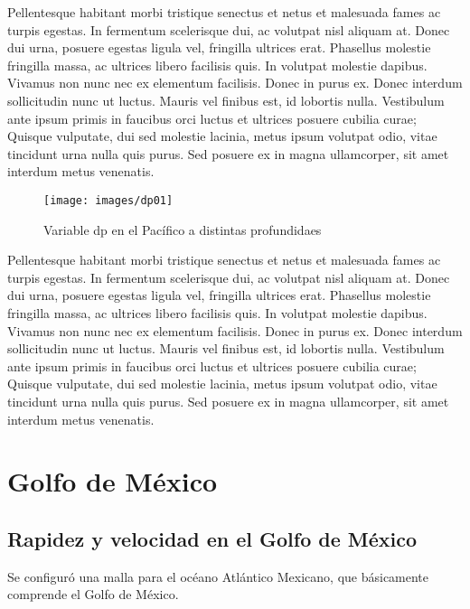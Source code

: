 \documentclass[
]{article}
\begin{document}
Pellentesque habitant morbi tristique senectus et netus et malesuada fames ac turpis egestas. In fermentum scelerisque dui, ac volutpat nisl aliquam at. Donec dui urna, posuere egestas ligula vel, fringilla ultrices erat. Phasellus molestie fringilla massa, ac ultrices libero facilisis quis. In volutpat molestie dapibus. Vivamus non nunc nec ex elementum facilisis. Donec in purus ex. Donec interdum sollicitudin nunc ut luctus. Mauris vel finibus est, id lobortis nulla. Vestibulum ante ipsum primis in faucibus orci luctus et ultrices posuere cubilia curae; Quisque vulputate, dui sed molestie lacinia, metus ipsum volutpat odio, vitae tincidunt urna nulla quis purus. Sed posuere ex in magna ullamcorper, sit amet interdum metus venenatis.

\begin{figure}
\texttt{[image: images/dp01]} \caption{Variable dp en el Pacífico a distintas profundidaes}\label{fig:Mapa02}
\end{figure}

Pellentesque habitant morbi tristique senectus et netus et malesuada fames ac turpis egestas. In fermentum scelerisque dui, ac volutpat nisl aliquam at. Donec dui urna, posuere egestas ligula vel, fringilla ultrices erat. Phasellus molestie fringilla massa, ac ultrices libero facilisis quis. In volutpat molestie dapibus. Vivamus non nunc nec ex elementum facilisis. Donec in purus ex. Donec interdum sollicitudin nunc ut luctus. Mauris vel finibus est, id lobortis nulla. Vestibulum ante ipsum primis in faucibus orci luctus et ultrices posuere cubilia curae; Quisque vulputate, dui sed molestie lacinia, metus ipsum volutpat odio, vitae tincidunt urna nulla quis purus. Sed posuere ex in magna ullamcorper, sit amet interdum metus venenatis.

\hypertarget{golfo-de-muxe9xico}{%
\section{Golfo de México}\label{golfo-de-muxe9xico}}

\hypertarget{rapidez-y-velocidad-en-el-golfo-de-muxe9xico}{%
\subsection{Rapidez y velocidad en el Golfo de México}\label{rapidez-y-velocidad-en-el-golfo-de-muxe9xico}}

Se configuró una malla para el océano Atlántico Mexicano, que básicamente comprende el Golfo de México.
\end{document}
